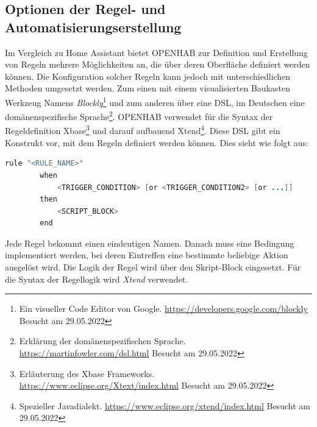     \subsection{Optionen der Regel- und Automatisierungserstellung}
        Im Vergleich zu Home Assistant bietet \acs{OPENHAB} zur Definition und Erstellung von Regeln mehrere Möglichkeiten an, die über deren Oberfläche definiert werden können. 
        Die Konfiguration solcher Regeln kann jedoch mit unterschiedlichen Methoden umgesetzt werden. Zum 
        einen mit einem visualisierten Baukasten Werkzeug Namens \textit{Blockly}\footnote{Ein visueller Code Editor von Google. \url{https://developers.google.com/blockly} Besucht am 29.05.2022} 
        und zum anderen über eine \ac{DSL}, im Deutschen eine domänenspezifische Sprache\footnote{Erklärung der domänenspezifischen Sprache. \url{https://martinfowler.com/dsl.html} Besucht am 29.05.2022}. 
        \acs{OPENHAB} verwendet für die Syntax der Regeldefinition Xbase\footnote{Erläuterung des Xbase Frameworks. \url{https://www.eclipse.org/Xtext/index.html} Besucht am 29.05.2022} 
        und darauf aufbauend Xtend\footnote{Spezieller Javadialekt. \url{https://www.eclipse.org/xtend/index.html} Besucht am 29.05.2022}. 
        Diese \acs{DSL} gibt ein Konstrukt vor, mit dem Regeln definiert werden können. Dies sieht wie folgt aus:
        \\
        \begin{lstlisting}[language=Java, frame=lines, xleftmargin=\parindent, style=algoBericht, label={code:Xbase}, captionpos=b, caption={Konstrukt zur Regeldefinition über Xbase}]
        rule "<RULE_NAME>"
        when
            <TRIGGER_CONDITION> [or <TRIGGER_CONDITION2> [or ...]]            
        then
            <SCRIPT_BLOCK>
        end
        \end{lstlisting}
        Jede Regel bekommt einen eindeutigen Namen. Danach muss eine Bedingung implementiert werden, bei deren Eintreffen 
        eine bestimmte beliebige Aktion ausgelöst wird. Die Logik der Regel wird über den Skript-Block eingesetzt. Für die Syntax 
        der Regellogik wird \textit{Xtend} verwendet. 


